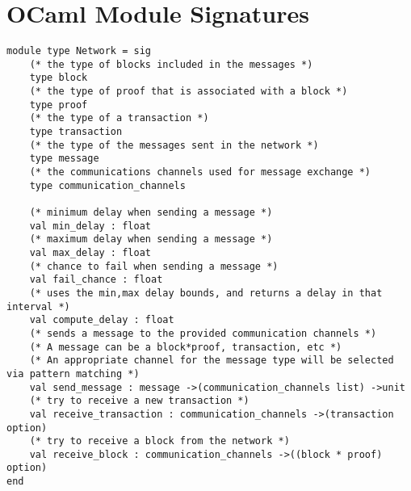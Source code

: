 

\chapter{OCaml Module Signatures}
\label{app:signatures}

\begin{lstlisting}
module type Network = sig
    (* the type of blocks included in the messages *)
    type block
    (* the type of proof that is associated with a block *)
    type proof
    (* the type of a transaction *)
    type transaction
    (* the type of the messages sent in the network *)
    type message
    (* the communications channels used for message exchange *)
    type communication_channels
  
    (* minimum delay when sending a message *)
    val min_delay : float
    (* maximum delay when sending a message *)
    val max_delay : float
    (* chance to fail when sending a message *)
    val fail_chance : float
    (* uses the min,max delay bounds, and returns a delay in that interval *)
    val compute_delay : float
    (* sends a message to the provided communication channels *)
    (* A message can be a block*proof, transaction, etc *)
    (* An appropriate channel for the message type will be selected via pattern matching *)
    val send_message : message ->(communication_channels list) ->unit
    (* try to receive a new transaction *)
    val receive_transaction : communication_channels ->(transaction option)
    (* try to receive a block from the network *)
    val receive_block : communication_channels ->((block * proof) option)
end
\end{lstlisting}

